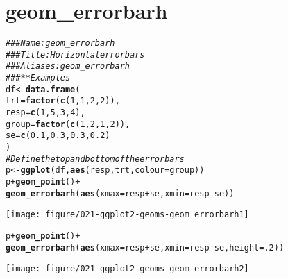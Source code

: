 \documentclass[a4paper,titlepage]{tufte-handout}\usepackage[]{graphicx}\usepackage[]{color}
\makeatletter
\def\maxwidth{ %
  \ifdim\Gin@nat@width>\linewidth
    \linewidth
  \else
    \Gin@nat@width
  \fi
}
\newcommand{\hlnum}[1]{\textcolor[rgb]{0.686,0.059,0.569}{#1}}%
\newcommand{\hlcom}[1]{\textcolor[rgb]{0.678,0.584,0.686}{\textit{#1}}}%
\newcommand{\hlopt}[1]{\textcolor[rgb]{0,0,0}{#1}}%
\newcommand{\hlstd}[1]{\textcolor[rgb]{0.345,0.345,0.345}{#1}}%
\newcommand{\hlkwb}[1]{\textcolor[rgb]{0.69,0.353,0.396}{#1}}%
\newcommand{\hlkwc}[1]{\textcolor[rgb]{0.333,0.667,0.333}{#1}}%
\newcommand{\hlkwd}[1]{\textcolor[rgb]{0.737,0.353,0.396}{\textbf{#1}}}%
\newenvironment{kframe}{%
 \def\at@end@of@kframe{}%
 \ifinner\ifhmode%
  \def\at@end@of@kframe{\end{minipage}}%
  \begin{minipage}{\columnwidth}%
 \fi\fi%
 \def\FrameCommand##1{\hskip\@totalleftmargin \hskip-\fboxsep
 \colorbox{shadecolor}{##1}\hskip-\fboxsep
     \hskip-\linewidth \hskip-\@totalleftmargin \hskip\columnwidth}%
 \MakeFramed {\advance\hsize-\width
   \@totalleftmargin\z@ \linewidth\hsize
   \@setminipage}}%
 {\par\unskip\endMakeFramed%
 \at@end@of@kframe}
\newenvironment{knitrout}{}{} %
\makeatother
\begin{document}
\section{geom\_errorbarh}

\begin{knitrout}
\color{fgcolor}\begin{kframe}
\begin{alltt}
\hlcom{### Name: geom_errorbarh}
\hlcom{### Title: Horizontal error bars}
\hlcom{### Aliases: geom_errorbarh}
\hlcom{### ** Examples}
\hlstd{df} \hlkwb{<-} \hlkwd{data.frame}\hlstd{(}
  \hlkwc{trt} \hlstd{=} \hlkwd{factor}\hlstd{(}\hlkwd{c}\hlstd{(}\hlnum{1}\hlstd{,} \hlnum{1}\hlstd{,} \hlnum{2}\hlstd{,} \hlnum{2}\hlstd{)),}
  \hlkwc{resp} \hlstd{=} \hlkwd{c}\hlstd{(}\hlnum{1}\hlstd{,} \hlnum{5}\hlstd{,} \hlnum{3}\hlstd{,} \hlnum{4}\hlstd{),}
  \hlkwc{group} \hlstd{=} \hlkwd{factor}\hlstd{(}\hlkwd{c}\hlstd{(}\hlnum{1}\hlstd{,} \hlnum{2}\hlstd{,} \hlnum{1}\hlstd{,} \hlnum{2}\hlstd{)),}
  \hlkwc{se} \hlstd{=} \hlkwd{c}\hlstd{(}\hlnum{0.1}\hlstd{,} \hlnum{0.3}\hlstd{,} \hlnum{0.3}\hlstd{,} \hlnum{0.2}\hlstd{)}
\hlstd{)}
\hlcom{# Define the top and bottom of the errorbars}
\hlstd{p} \hlkwb{<-} \hlkwd{ggplot}\hlstd{(df,} \hlkwd{aes}\hlstd{(resp, trt,} \hlkwc{colour} \hlstd{= group))}
\hlstd{p} \hlopt{+} \hlkwd{geom_point}\hlstd{()} \hlopt{+}
  \hlkwd{geom_errorbarh}\hlstd{(}\hlkwd{aes}\hlstd{(}\hlkwc{xmax} \hlstd{= resp} \hlopt{+} \hlstd{se,} \hlkwc{xmin} \hlstd{= resp} \hlopt{-} \hlstd{se))}
\end{alltt}
\end{kframe}
\texttt{[image: figure/021-ggplot2-geoms-geom\_errorbarh1]} 
\begin{kframe}\begin{alltt}
\hlstd{p} \hlopt{+} \hlkwd{geom_point}\hlstd{()} \hlopt{+}
  \hlkwd{geom_errorbarh}\hlstd{(}\hlkwd{aes}\hlstd{(}\hlkwc{xmax} \hlstd{= resp} \hlopt{+} \hlstd{se,} \hlkwc{xmin} \hlstd{= resp} \hlopt{-} \hlstd{se,} \hlkwc{height} \hlstd{=} \hlnum{.2}\hlstd{))}
\end{alltt}
\end{kframe}
\texttt{[image: figure/021-ggplot2-geoms-geom\_errorbarh2]} 
\begin{kframe}\begin{alltt}


\end{alltt}
\end{kframe}
\end{knitrout}
\end{document}
